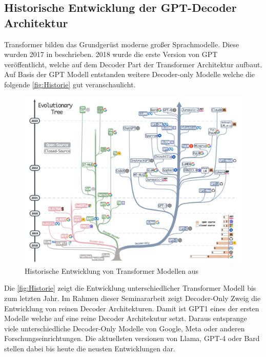 \documentclass[conference]{IEEEtran}
\begin{document}
\subsection{Historische Entwicklung der GPT-Decoder Architektur}
Transformer bilden das Grundgerüst moderne großer Sprachmodelle. Diese wurden 2017 in \cite{vaswaniAttentionAllYou2023}  beschrieben. 2018 wurde die erste Version von GPT veröffentlicht, welche auf dem Decoder Part der Transformer Architektur aufbaut. Auf Basis der GPT Modell entstanden weitere Decoder-only Modelle welche die folgende \autoref{fig:Historie} gut veranschaulicht.
\begin{figure}[htbp]
    \centerline{\includegraphics[width=\linewidth]{Bilder/EntwicklungLLM.png}}
    \caption{Historische Entwicklung von Transformer Modellen aus \cite{yangHarnessingPowerLLMs}}
    \label{fig:Historie}
\end{figure}
Die \autoref{fig:Historie} zeigt die Entwicklung unterschiedlicher Transformer Modell bis zum letzten Jahr. Im Rahmen dieser Seminararbeit zeigt Decoder-Only Zweig die Entwicklung von reinen Decoder Architekturen. Damit ist GPT1 eines der ersten Modelle welche auf eine reine Decoder Architekutur setzt. Daraus entsprange viele unterschiedliche Decoder-Only Modelle von Google, Meta oder anderen Forschungseinrichtungen. Die aktuellsten versionen von Llama, GPT-4 oder Bard stellen dabei bis heute die neusten Entwicklungen dar.
\end{document}
